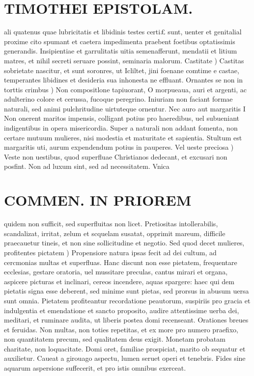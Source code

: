 \documentclass{article}
\begin{document}
\begin{pages}
\section*{TIMOTHEI EPISTOLAM. }
\marginpar{[ p.58 ]}\pstart ali quatenus quae lubricitatis et libidinis testes certi£ sunt, uenter et genitalial proxime cito spumant et caetera impedimenta praebent foetibus optatissimis generandis. Insipientiae et garrulitatis uitia semenafferunt, mendatii et litium matres, et nihil secreti seruare possint, seminaria malorum.  \pend\pstart Castitate ) Castitas sobrietate nascitur, et sunt soronres, ut Icliltet, jini foenane comtime e castae, temperantes libidines et desideria sua inhonesta ne effluant.  \pend\pstart Ornantes se non in torttis crimbus ) Non compositlone tapiuorant, O morpueaua, auri et argenti, ac adulterino colore et cerussa, fucoque peregrino. Iniuriam non faciant formae naturali, sed animi pulchritudine uirtuteque ornentur.  \pend\pstart Nec auro aut margaritis I Non onerent maritos impensis, colligant potius pro haeredibus, uel subueniant indigentibus in opera misericordia. Super a naturali non addant fomenta, non certare mutuum mulieres, nisi modestia et maturitate et sapientia. Stultum est margaritis uti, aurum expendendum potius in pauperes.  \pend\pstart Vel ueste preciosa ) Veste non uestibus, quod superfluae Christianos dedecant, et excusari non posfint. Non ad luxum sint, sed ad necessitatem. Vnica  \pend
\section*{COMMEN. IN PRIOREM }
\marginpar{[ p.59 ]}\pstart quidem non sufficit, sed superfluitas non licet. Pretiositas intollerabilis, scandalizat, irritat, zelum et scquelam susatat, opprimit mareum, difficile praecauetur tineis, et non sine sollicitudine et negotio.  \pend\pstart Sed quod decet mulieres, profitentes pictatem )  Propensiore natura ipsas fecit ad dei cultum, ad cercmonias multas et superfluas. Hanc discunt non esse pietatem, frequentare ecclesias, gestare oratoria, uel mussitare preculas, cantus mirari et organa, aspicere picturas et inclinari, cereos incendere, aquas spargere: haec qui dem pietatis signa esse deberent, sed minime sunt pietas, sed prorsus in abusum uersa sunt omnia. Pietatem profiteantur recordatione peautorum, suspiriis pro gracia et indulgentia et emendatione et sancto proposito, audire attentissime uerba dei, meditari, et ruminare audita, ut liberis postea domi recenseant. Orationes breues et feruidas. Non multas, non toties repetitas, et ex more pro numero praefixo, non quantitatem precum, sed qualitatem deus exigit. Monetam probatam charitate, non loquacitate. Domi oret, familiae prospiciat, marito ob sequatur et auxilietur. Caueat a girouago aspectu, lumen seruet operi et tenebris. Fides sine aquarum aspersione suffecerit, et pro istis omnibus exerceat.  \pend

\end{pages}
\end{document}
